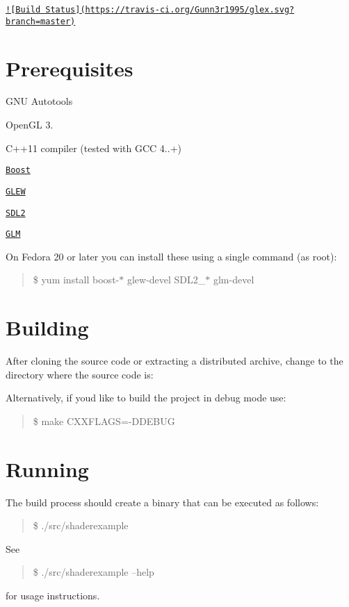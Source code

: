 \href{https://travis-ci.org/Gunn3r1995/glex}{\tt !\mbox{[}Build Status\mbox{]}(https\+://travis-\/ci.\+org/\+Gunn3r1995/glex.\+svg?branch=master)}

\section*{Prerequisites}


\begin{DoxyItemize}
\item G\+N\+U Autotools
\item Open\+G\+L 3.
\item C++11 compiler (tested with G\+C\+C 4..+)
\item \href{http://www.boost.org/}{\tt Boost}
\item \href{http://glew.sourceforge.net/}{\tt G\+L\+E\+W}
\item \href{https://www.libsdl.org/}{\tt S\+D\+L2}
\item \href{http://glm.g-truc.net/}{\tt G\+L\+M}
\end{DoxyItemize}

On Fedora 20 or later you can install these using a single command (as root)\+:

\begin{quote}
\$ yum install boost-\/$\ast$ glew-\/devel S\+D\+L2\+\_\+$\ast$ glm-\/devel \end{quote}


\section*{Building}

After cloning the source code or extracting a distributed archive, change to the directory where the source code is\+:




Alternatively, if you\textquotesingle{}d like to build the project in debug mode use\+:

\begin{quote}
\$ make C\+X\+X\+F\+L\+A\+G\+S=-\/\+D\+D\+E\+B\+U\+G \end{quote}


\section*{Running}

The build process should create a binary that can be executed as follows\+:

\begin{quote}
\$ ./src/shaderexample \end{quote}


See

\begin{quote}
\$ ./src/shaderexample --help \end{quote}


for usage instructions. 